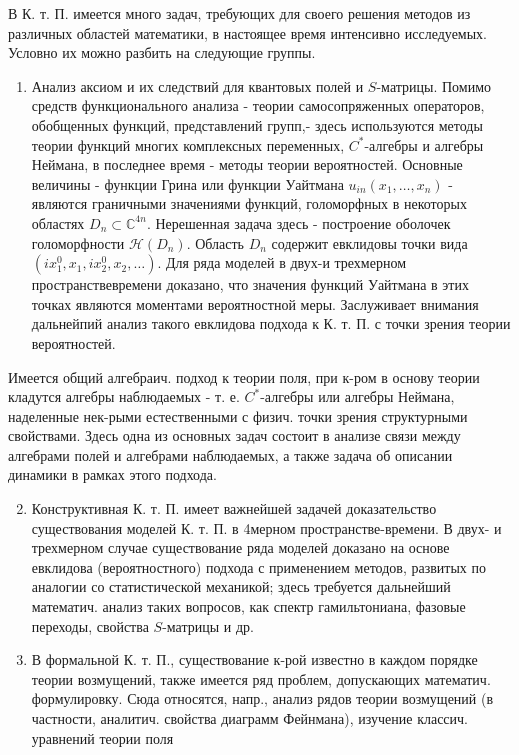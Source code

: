 \documentclass[10pt]{article}
\begin{document}
В К. т. П. имеется много задач, требующих для своего решения методов из различных областей математики, в настоящее время интенсивно исследуемых. Условно их можно разбить на следующие группы.



\begin{enumerate}

  \item Анализ аксиом и их следствий для квантовых полей и $S$-матрицы. Помимо средств функционального анализа - теории самосопряженных операторов, обобщенных функций, представлений групп,- здесь используются методы теории функций многих комплексных переменных, $C^{*}$-алгебры и алгебры Неймана, в последнее время - методы теории вероятностей. Основные величины - функции Грина или функции Уайтмана $u_{i n}\left(x_{1}, \ldots, x_{n}\right)$ - являются граничными значениями функций, голоморфных в некоторых областях $D_{n} \subset \mathbb{C}^{4 n}$. Нерешенная задача здесь - построение оболочек голоморфности $\mathscr{H}\left(D_{n}\right)$. Область $D_{n}$ содержит евклидовы точки вида $\left(i x_{1}^{0}, x_{1}, i x_{2}^{0}, x_{2}, \ldots\right)$. Для ряда моделей в двух-и трехмерном пространствевремени доказано, что значения функций Уайтмана в этих точках являются моментами вероятностной меры. Заслуживает внимания дальнейпий анализ такого евклидова подхода к К. т. П. с точки зрения теории вероятностей.

\end{enumerate}



Имеется общий алгебраич. подход к теории поля, при к-ром в основу теории кладутся алгебры наблюдаемых - т. е. $C^{*}$-алгебры или алгебры Неймана, наделенные нек-рыми естественными с физич. точки зрения структурными свойствами. Здесь одна из основных задач состоит в анализе связи между алгебрами полей и алгебрами наблюдаемых, а также задача об описании динамики в рамках этого подхода.



\begin{enumerate}

  \setcounter{enumi}{1}

  \item Конструктивная К. т. П. имеет важнейшей задачей доказательство существования моделей К. т. П. в 4мерном пространстве-времени. В двух- и трехмерном случае существование ряда моделей доказано на основе евклидова (вероятностного) подхода с применением методов, развитых по аналогии со статистической механикой; здесь требуется дальнейший математич. анализ таких вопросов, как спектр гамильтониана, фазовые переходы, свойства $S$-матрицы и др.



  \item В формальной К. т. П., существование к-рой известно в каждом порядке теории возмущений, также имеется ряд проблем, допускающих математич. формулировку. Сюда относятся, напр., анализ рядов теории возмущений (в частности, аналитич. свойства диаграмм Фейнмана), изучение классич. уравнений теории поля



\end{enumerate}
\end{document}
